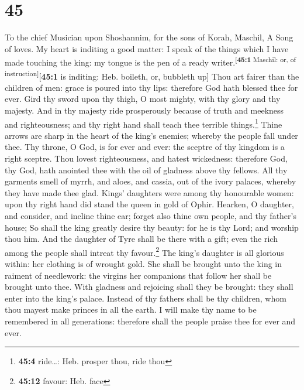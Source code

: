 \hypertarget{section-44}{%
\section{45}\label{section-44}}

To the chief Musician upon Shoshannim, for the sons of Korah, Maschil, A
Song of loves.  My heart is inditing a good matter: I
speak of the things which I have made touching the king: my tongue is
the pen of a ready writer.\textsuperscript{{[}\textbf{45:1} Maschil: or,
of instruction{]}}{[}\textbf{45:1} is inditing: Heb. boileth, or,
bubbleth up{]}  Thou art fairer than the children of men:
grace is poured into thy lips: therefore God hath blessed thee for ever.
 Gird thy sword upon thy thigh, O most mighty, with thy
glory and thy majesty.  And in thy majesty ride
prosperously because of truth and meekness and righteousness; and thy
right hand shall teach thee terrible things.\footnote{\textbf{45:4}
  ride\ldots: Heb. prosper thou, ride thou}  Thine arrows
are sharp in the heart of the king's enemies; whereby the people fall
under thee.  Thy throne, O God, is for ever and ever: the
sceptre of thy kingdom is a right sceptre.  Thou lovest
righteousness, and hatest wickedness: therefore God, thy God, hath
anointed thee with the oil of gladness above thy fellows. 
All thy garments smell of myrrh, and aloes, and cassia, out of the ivory
palaces, whereby they have made thee glad.  Kings'
daughters were among thy honourable women: upon thy right hand did stand
the queen in gold of Ophir.  Hearken, O daughter, and
consider, and incline thine ear; forget also thine own people, and thy
father's house;  So shall the king greatly desire thy
beauty: for he is thy Lord; and worship thou him.  And
the daughter of Tyre shall be there with a gift; even the rich among the
people shall intreat thy favour.\footnote{\textbf{45:12} favour: Heb.
  face}  The king's daughter is all glorious within: her
clothing is of wrought gold.  She shall be brought unto
the king in raiment of needlework: the virgins her companions that
follow her shall be brought unto thee.  With gladness and
rejoicing shall they be brought: they shall enter into the king's
palace.  Instead of thy fathers shall be thy children,
whom thou mayest make princes in all the earth.  I will
make thy name to be remembered in all generations: therefore shall the
people praise thee for ever and ever.


